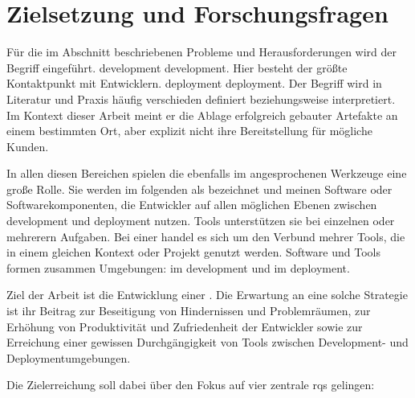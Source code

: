 \section{Zielsetzung und Forschungsfragen}
\label{sec:01-03_objectives-and-research-questions}

Für die im Abschnitt  beschriebenen Probleme und Herausforderungen wird der Begriff  eingeführt. \Gls{development} \glsdesc{development}. Hier besteht der größte Kontaktpunkt mit Entwicklern. \Gls{deployment} \glsdesc{deployment}. Der Begriff wird in Literatur und Praxis häufig verschieden definiert beziehungsweise interpretiert. Im Kontext dieser Arbeit meint er die Ablage erfolgreich gebauter Artefakte an einem bestimmten Ort, aber explizit nicht ihre Bereitstellung für mögliche Kunden.

In allen diesen Bereichen spielen die ebenfalls im  angesprochenen Werkzeuge eine große Rolle. Sie werden im folgenden als  bezeichnet und meinen Software oder Softwarekomponenten, die Entwickler auf allen möglichen Ebenen zwischen \Gls{development} und \Gls{deployment} nutzen. Tools unterstützen sie bei einzelnen oder mehrerern Aufgaben. Bei einer  handel es sich um den Verbund mehrer Tools, die in einem gleichen Kontext oder Projekt genutzt werden. Software und Tools formen zusammen Umgebungen:  im \Gls{development} und  im \Gls{deployment}.

Ziel der Arbeit ist die Entwicklung einer . Die Erwartung an eine solche Strategie ist ihr Beitrag zur Beseitigung von Hindernissen und Problemräumen, zur Erhöhung von Produktivität und Zufriedenheit der Entwickler sowie zur Erreichung einer gewissen Durchgängigkeit von Tools zwischen Development- und Deploymentumgebungen.

Die Zielerreichung soll dabei über den Fokus auf vier zentrale \Glspl{rq} gelingen:


